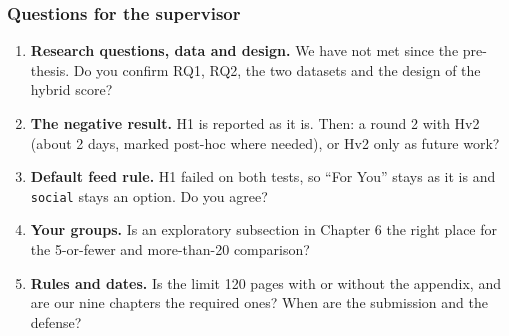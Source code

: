 \documentclass[aspectratio=169,11pt]{beamer}
\begin{document}
\begin{frame}
  \frametitle{Questions for the supervisor}
  \begin{enumerate}\small
    \setlength\itemsep{2.5mm}
    \item \textbf{Research questions, data and design.} We have not met since the pre-thesis. Do you confirm RQ1, RQ2, the two datasets and the design of the hybrid score?
    \item \textbf{The negative result.} H1 is reported as it is. Then: a round 2 with Hv2 (about 2 days, marked post-hoc where needed), or Hv2 only as future work?
    \item \textbf{Default feed rule.} H1 failed on both tests, so ``For You'' stays as it is and \texttt{social} stays an option. Do you agree?
    \item \textbf{Your groups.} Is an exploratory subsection in Chapter 6 the right place for the 5-or-fewer and more-than-20 comparison?
    \item \textbf{Rules and dates.} Is the limit 120 pages with or without the appendix, and are our nine chapters the required ones? When are the submission and the defense?
  \end{enumerate}
\end{frame}
\end{document}
